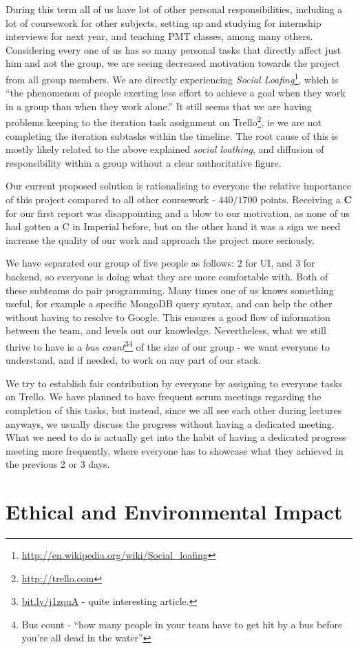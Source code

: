 \documentclass[a4paper,12pt]{article}
\begin{document}
	During this term all of us have lot of other personal responsibilities, including a lot of coursework for other subjects, setting up and studying for internship interviews for next year, and teaching PMT classes, among many others. Considering every one of us has so many personal tasks that directly affect just him and not the group, we are seeing decreased motivation towards the project from all group members. We are directly experiencing \emph{Social Loafing}\footnote{\url{http://en.wikipedia.org/wiki/Social_loafing}}, which is ``the phenomenon of people exerting less effort to achieve a goal when they work in a group than when they work alone.'' It still seems that we are having problems keeping to the iteration task assignment on Trello\footnote{\url{http://trello.com}}, ie we are not completing the iteration subtasks within the timeline. The root cause of this is mostly likely related to the above explained \emph{social loathing}, and diffusion of responsibility within a group without a clear authoritative figure.
	
	Our current proposed solution is rationalising to everyone the relative importance of this project compared to all other coursework - $440/1700$ points. Receiving a \textbf{C} for our first report was disappointing and a blow to our motivation, as none of us had gotten a C in Imperial before, but on the other hand it was a sign we need increase the quality of our work and approach the project more seriously.
	
	We have separated our group of five people as follows: 2 for UI, and 3 for backend, so everyone is doing what they are more comfortable with. Both of these subteams do pair programming. Many times one of us knows something useful, for example a specific MongoDB query syntax, and can help the other without having to resolve to Google. This ensures a good flow of information between the team, and levels out our knowledge. Nevertheless, what we still thrive to have is a \emph{bus count}\footnote{\url{bit.ly/j1zquA} - quite interesting article.}\footnote{Bus count - ``how many people in your team have to get hit by a bus before you’re all dead in the water''} of the size of our group - we want everyone to understand, and if needed, to work on any part of our stack.
	
	We try to establish fair contribution by everyone by assigning to everyone tasks on Trello. We have planned to have frequent scrum meetings regarding the completion of this tasks, but instead, since we all see each other during lectures anyways, we usually discuss the progress without having a dedicated meeting. What we need to do is actually get into the habit of having a dedicated progress meeting more frequently, where everyone has to showcase what they achieved in the previous 2 or 3 days.
	
	\section{Ethical and Environmental Impact}	
\end{document}
